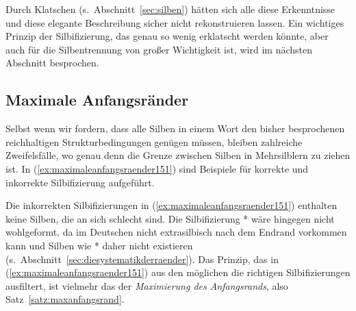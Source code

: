 Durch Klatschen (s.\ Abschnitt~\ref{sec:silben}) hätten sich alle diese Erkenntnisse und diese elegante Beschreibung sicher nicht rekonstruieren lassen.
Ein wichtiges Prinzip der Silbifizierung, das genau so wenig erklatscht werden könnte, aber auch für die Silbentrennung von großer Wichtigkeit ist, wird im nächsten Abschnitt besprochen.

\subsection{Maximale Anfangsränder}
\label{sec:maximaleanfangsraender}


Selbst wenn wir fordern, dass alle Silben in einem Wort den bisher besprochenen reichhaltigen Strukturbedingungen genügen müssen, bleiben zahlreiche Zweifelsfälle, wo genau denn die Grenze zwischen Silben in Mehrsilblern zu ziehen ist.
In (\ref{ex:maximaleanfangsraender151}) sind Beispiele für korrekte und inkorrekte Silbifizierung aufgeführt.

\begin{exe}
  \ex \label{ex:maximaleanfangsraender151}
  \begin{xlist}
  \end{xlist}
\end{exe}

Die inkorrekten Silbifizierungen in (\ref{ex:maximaleanfangsraender151}) enthalten keine Silben, die an sich schlecht sind.
Die Silbifizierung *\textipa{[kOmpl.Et]} wäre hingegen nicht wohlgeformt, da \textipa{[l]} im Deutschen nicht extrasilbisch nach dem Endrand vorkommen kann und Silben wie *\textipa{[kOmpl]} daher nicht existieren (s.\ Abschnitt~\ref{sec:diesystematikderraender}).
Das Prinzip, das in (\ref{ex:maximaleanfangsraender151}) aus den möglichen die richtigen Silbifizierungen ausfiltert, ist vielmehr das der \textit{Maximierung des Anfangsrands}, also Satz~\ref{satz:maxanfangsrand}.



